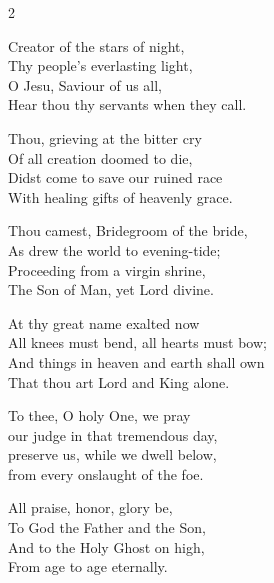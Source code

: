 \begin{multicols}{2}
\begin{enpars}
Creator of the stars of night,\\
Thy people’s everlasting light,\\
O Jesu, Saviour of us all,\\
Hear thou thy servants when they call.

Thou, grieving at the bitter cry\\
Of all creation doomed to die,\\
Didst come to save our ruined race\\
With healing gifts of heavenly grace.

Thou camest, Bridegroom of the bride,\\
As drew the world to evening-tide;\\
Proceeding from a virgin shrine,\\
The Son of Man, yet Lord divine.

At thy great name exalted now\\
All knees must bend, all hearts must bow;\\
And things in heaven and earth shall own\\
That thou art Lord and King alone.

To thee, O holy One, we pray\\
our judge in that tremendous day,\\
preserve us, while we dwell below,\\
from every onslaught of the foe.

All praise, honor, glory be,\\
To God the Father and the Son,\\
And to the Holy Ghost on high,\\
From age to age eternally.
\end{enpars}
\end{multicols}